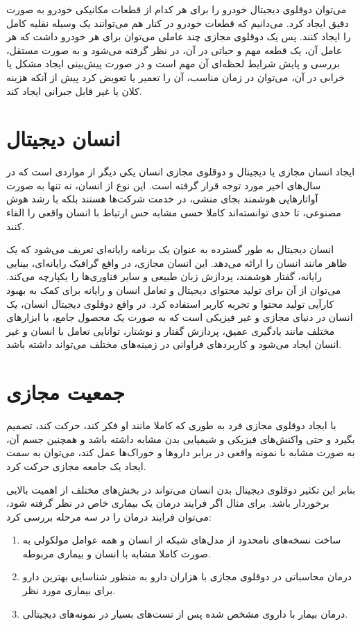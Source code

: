 می‌توان دوقلوی دیجیتال خودرو را برای هر کدام از قطعات مکانیکی خودرو به صورت دقیق ایجاد کرد. می‌دانیم که قطعات خودرو در کنار هم می‌توانند یک وسیله نقلیه کامل را ایجاد کنند. پس یک دوقلوی مجازی چند عاملی می‌توان برای هر خودرو داشت که هر عامل آن، یک قطعه مهم و حیاتی در آن، در نظر گرفته می‌شود و به صورت مستقل، بررسی و پایش شرایط لحظه‌ای آن مهم است و در صورت پیش‌بینی ایجاد مشکل یا خرابی در آن، می‌توان در زمان مناسب، آن را تعمیر یا تعویض کرد پیش از آنکه هزینه کلان یا غیر قابل جبرانی ایجاد کند.

\section{انسان دیجیتال}
ایجاد انسان مجازی یا دیجیتال و دوقلوی مجازی انسان 
یکی دیگر از مواردی است که در سال‌های اخیر مورد توجه قرار گرفته است. این نوع از انسان، نه تنها به صورت آواتارهایی هوشمند بجای منشی، در خدمت شرکت‌ها هستند بلکه با رشد هوش مصنوعی، تا حدی توانسته‌اند کاملا حسی مشابه حس ارتباط با انسان واقعی را القاء کنند.

انسان دیجیتال به طور گسترده به عنوان یک برنامه رایانه‌ای تعریف می‌شود که یک ظاهر مانند انسان را ارائه می‌دهد. این انسان مجازی، در واقع گرافیک رایانه‌ای، بینایی رایانه، گفتار هوشمند، پردازش زبان طبیعی و سایر فناوری‌ها را یکپارچه می‌کند. می‌توان از آن برای تولید محتوای دیجیتال و تعامل انسان و رایانه برای کمک به بهبود کارآیی تولید محتوا و تجربه کاربر استفاده کرد. در واقع دوقلوی دیجیتال انسان، یک انسان در دنیای مجازی و غیر فیزیکی است که به صورت یک محصول جامع، با ابزار‌های مختلف مانند یادگیری عمیق،‌ پردازش گفتار و نوشتار، توانایی تعامل با انسان و غیر انسان ایجاد می‌شود و کاربرد‌های فراوانی در زمینه‌های مختلف می‌تواند داشته باشد.

\section{جمعیت مجازی}
با ایجاد دوقلوی مجازی فرد به طوری که کاملا مانند او فکر کند، حرکت کند، تصمیم بگیرد و حتی واکنش‌های فیزیکی و شیمیایی بدن مشابه داشته باشد و همچنین جسم آن، به صورت مشابه با نمونه واقعی در برابر دارو‌ها و خوراک‌ها عمل کند، می‌توان به سمت ایجاد یک جامعه مجازی حرکت کرد.

بنابر این تکثیر دوقلوی دیجیتال بدن انسان می‌تواند در بخش‌های مختلف از اهمیت بالایی برخوردار باشد. برای مثال اگر فرایند درمان یک بیماری خاص در نظر گرفته شود، می‌توان فرایند درمان را در سه مرحله بررسی کرد:
\begin{enumerate}
	\item 
ساخت نسخه‌های نامحدود از مدل‌های شبکه از انسان و همه عوامل مولکولی به صورت کاملا مشابه با انسان و بیماری مربوطه.
	\item 
درمان محاسباتی در دوقلوی مجازی با هزاران دارو به منظور شناسایی بهترین دارو برای بیماری مورد نظر.
	\item 
درمان بیمار با داروی مشخص شده پس از تست‌های بسیار در نمونه‌های دیجیتالی.
\end{enumerate}

